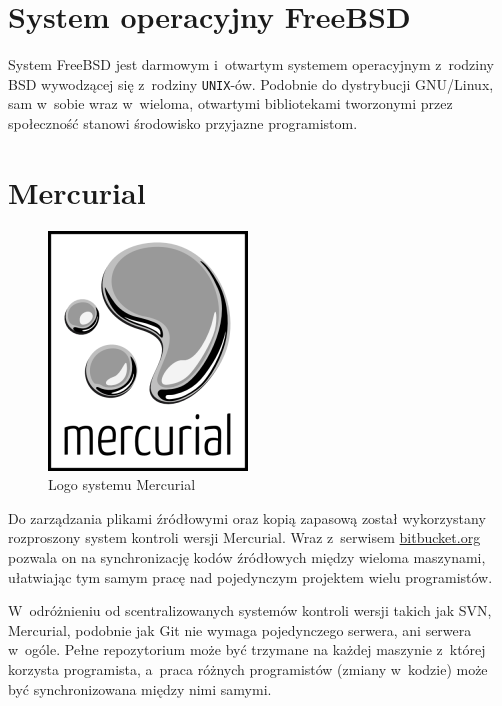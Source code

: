 \section{System operacyjny FreeBSD}
\par
System FreeBSD jest darmowym i~otwartym systemem operacyjnym z~rodziny BSD wywodzącej się z~rodziny \texttt{UNIX}-ów. Podobnie do dystrybucji GNU/Linux, sam w~sobie wraz w~wieloma, otwartymi bibliotekami tworzonymi przez społeczność stanowi środowisko przyjazne programistom.

\section{Mercurial}
\begin{figure}
\begin{center}
\includegraphics[scale=0.50]{img/mercurial_logo.png}
\end{center}
\caption{Logo systemu Mercurial}
\end{figure}
\par
Do zarządzania plikami źródłowymi oraz kopią zapasową został wykorzystany rozproszony system kontroli wersji Mercurial. Wraz z~serwisem \url{bitbucket.org} pozwala on na synchronizację kodów źródłowych między wieloma maszynami, ułatwiając tym samym pracę nad pojedynczym projektem wielu programistów.
\par
 W~odróżnieniu od scentralizowanych systemów kontroli wersji takich jak SVN, Mercurial, podobnie jak Git nie wymaga pojedynczego serwera, ani serwera w~ogóle. Pełne repozytorium może być trzymane na każdej maszynie z~której korzysta programista, a~praca różnych programistów (zmiany w~kodzie) może być synchronizowana między nimi samymi\cite{version-control-example}.

